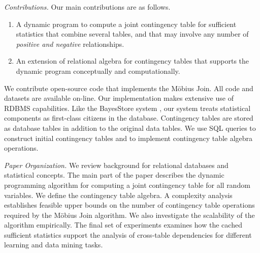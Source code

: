 \documentclass{sig-alternate-2013}
\begin{document}
\emph{Contributions.} Our main contributions 
are as follows.
\begin{enumerate}
\item A dynamic program to compute a joint contingency table for sufficient statistics that combine several tables, and that may involve any number of {\em positive and negative }relationships.
\item An extension of relational algebra for contingency tables that supports the dynamic program conceptually and computationally.
\end{enumerate}

We contribute open-source code that implements the M\"obius Join. All code and datasets are available on-line\cite{bib:jbnsite}. Our implementation makes extensive use of RDBMS capabilities. Like the BayesStore system \cite{Wang2008}, our system treats statistical components as first-class citizens in the database. Contingency tables are stored as database tables  in addition to the original data tables. We use SQL queries to construct initial contingency tables and to implement contingency table algebra operations. 

\emph{Paper Organization.} 
We review background for relational databases and statistical concepts. 
The main part of the paper describes the dynamic programming algorithm for computing a joint contingency table for all random variables. 
We define the contingency table algebra. 
A complexity analysis establishes feasible upper bounds on the number of contingency table operations required by the M\"obius Join algorithm. 
We also investigate the scalability of the algorithm empirically. 
The final set of experiments examines how the cached sufficient statistics support the analysis of cross-table dependencies for different learning and data mining tasks.


 
\end{document}
